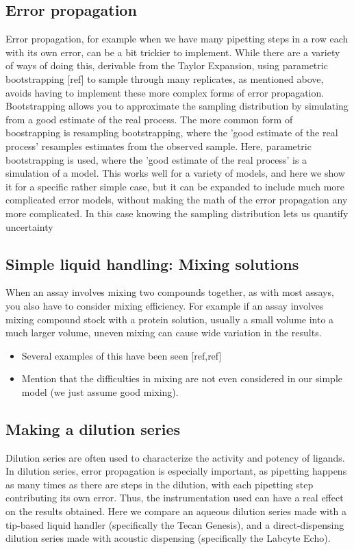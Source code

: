 \documentclass[aps,pre,twocolumn,nofootinbib,superscriptaddress,linenumbers]{revtex4-1}
\begin{document}
\subsection*{Error propagation}

Error propagation, for example when we have many pipetting steps in a row each with its own error, can be a bit trickier to implement. 
While there are a variety of ways of doing this, derivable from the Taylor Expansion, using parametric bootstrapping [ref] to sample through many replicates, as mentioned above, avoids having to implement these more complex forms of error propagation.
Bootstrapping allows you to approximate the sampling distribution by simulating from a good estimate of the real process.
The more common form of boostrapping is resampling bootstrapping, where the 'good estimate of the real process' resamples estimates from the observed sample.
Here, parametric bootstrapping is used, where the 'good estimate of the real process' is a simulation of a model.
This works well for a variety of models, and here we show it for a specific rather simple case, but it can be expanded to include much more complicated error models, without making the math of the error propagation any more complicated.
In this case knowing the sampling distribution lets us quantify uncertainty

\subsection*{Simple liquid handling: Mixing solutions}

When an assay involves mixing two compounds together, as with most assays, you also have to consider mixing efficiency. 
For example if an assay involves mixing compound stock with a protein solution, usually a small volume into a much larger volume, uneven mixing can cause wide variation in the results. 
\begin{itemize}
  \item Several examples of this have been seen [ref,ref]
  \item Mention that the difficulties in mixing are not even considered in our simple model (we just assume good mixing).
\end{itemize}

\subsection*{Making a dilution series}

Dilution series are often used to characterize the activity and potency of ligands. 
In dilution series, error propagation is especially important, as pipetting happens as many times as there are steps in the dilution, with each pipetting step contributing its own error. 
Thus, the instrumentation used can have a real effect on the results obtained.
Here we compare an aqueous dilution series made with a tip-based liquid handler (specifically the Tecan Genesis), and a direct-dispensing dilution series made with acoustic dispensing (specifically the Labcyte Echo).
\end{document}
